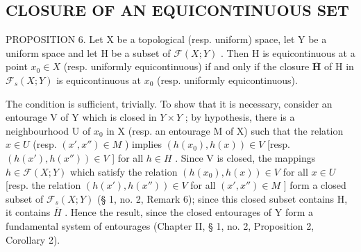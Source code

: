 \subsection{CLOSURE OF AN EQUICONTINUOUS SET}

PROPOSITION 6. Let X be a topological (resp. uniform) space, let Y be a uniform space and let H be a subset of \(\mathcal{F}(X;Y)\) . Then H is equicontinuous at a point \(x_0 \in X\) (resp. uniformly equicontinuous) if and only if the closure \(\overline{\mathbf{H}}\) of H in \(\mathcal{F}_s(X;Y)\) is equicontinuous at \(x_0\) (resp. uniformly equicontinuous).

The condition is sufficient, trivially. To show that it is necessary, consider an entourage V of Y which is closed in \(Y \times Y\) ; by hypothesis, there is a neighbourhood U of \(x_{0}\) in X (resp. an entourage M of X) such that the relation \(x \in U\) (resp. \((x', x'') \in M\) ) implies \((h(x_{0}), h(x)) \in V\) {[}resp. \((h(x'), h(x'')) \in V\) {]} for all \(h \in H\) . Since V is closed, the mappings \(h \in \mathcal{F}(X; Y)\) which satisfy the relation \((h(x_{0}), h(x)) \in V\) for all \(x \in U\) {[}resp. the relation \((h(x'), h(x'')) \in V\) for all \((x', x'') \in M\) {]} form a closed subset of \(\mathcal{F}_{s}(X; Y)\) (§ 1, no. 2, Remark 6); since this closed subset contains H, it contains \(\overline{H}\) . Hence the result, since the closed entourages of Y form a fundamental system of entourages (Chapter II, § 1, no. 2, Proposition 2, Corollary 2).


